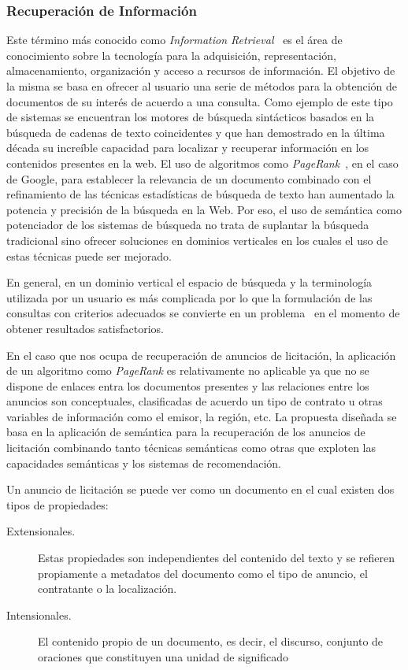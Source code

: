 \subsubsection{Recuperación de Información}
Este término más conocido como \textit{Information Retrieval}~\cite{Manning:2008:IIR:1394399} es el área 
de conocimiento sobre la tecnología para la adquisición, representación, almacenamiento, 
organización y acceso a recursos de información. El objetivo de la misma 
se basa en ofrecer al usuario una serie de métodos para la obtención 
de documentos de su interés de acuerdo a una consulta. Como ejemplo 
de este tipo de sistemas se encuentran los motores de búsqueda sintácticos 
basados en la búsqueda de cadenas de texto coincidentes y que han demostrado 
en la última década su increíble capacidad para localizar y recuperar 
información en los contenidos presentes en la web. El uso de algoritmos 
como \textit{PageRank}~\cite{Page:1998:PCR}, en el caso de Google, para establecer la relevancia 
de un documento combinado con el refinamiento de las técnicas estadísticas 
de búsqueda de texto han aumentado la potencia y precisión de la búsqueda 
en la Web. Por eso, el uso de semántica como potenciador de los sistemas 
de búsqueda no trata de suplantar la búsqueda tradicional sino ofrecer soluciones 
en dominios verticales en los cuales el uso de estas técnicas puede ser mejorado.

En general, en un dominio vertical el espacio de búsqueda y la terminología 
utilizada por un usuario es más complicada por lo que la formulación de las 
consultas con criterios adecuados se convierte en un problema~\cite{Maslov2009} en el momento 
de obtener resultados satisfactorios.

En el caso que nos ocupa de recuperación de anuncios de licitación, la aplicación 
de un algoritmo como \textit{PageRank} es relativamente no aplicable ya que 
no se dispone de enlaces entra los documentos presentes y las relaciones 
entre los anuncios son conceptuales, clasificadas de acuerdo un tipo de 
contrato u otras variables de información como el emisor, la región, etc. La 
propuesta diseñada se basa en la aplicación de semántica para la recuperación 
de los anuncios de licitación combinando tanto técnicas semánticas como otras 
que exploten las capacidades semánticas y los sistemas de recomendación. 

Un anuncio de licitación se puede ver como un documento en el cual existen dos 
tipos de propiedades:
\begin{description}
 \item [Extensionales.] Estas propiedades son independientes del contenido 
del texto y se refieren propiamente a metadatos del documento como el tipo 
de anuncio, el contratante o la localización.
\item [Intensionales.] El contenido propio de un documento, es decir, el  
discurso, conjunto de oraciones que constituyen una unidad de significado
\end{description}

